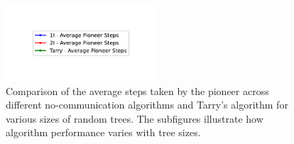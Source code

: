 \begin{figure}[H]
    \centering
    \qquad
    \qquad
    \includegraphics[width=0.5\textwidth]{Cap3/no_comm_steps_legend.pdf}
    \newline
    \qquad
    \newline
    \qquad
    \caption{Comparison of the average steps taken by the pioneer across different no-communication algorithms and Tarry's algorithm for various sizes of random trees. The subfigures illustrate how algorithm performance varies with tree sizes.}
    \label{fig_no_comm_steps_all_sizes_tree}
\end{figure}

